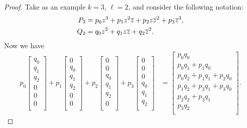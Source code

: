 \begin{proposition}
\begin{proof}
Take as an example $k=3$, $\ell=2$, and consider the following notation:
\begin{align*}
P_3&=p_0z^3+p_1z^2\overline{z}+p_2z\overline{z}^2+p_3\overline{z}^3,\\
Q_2&=q_0z^2+q_1z\overline{z}+q_2\overline{z}^2.
\end{align*}
Now we have
\begin{align*}
p_0
\begin{bmatrix}
q_0\\
q_1\\
q_2\\
0\\
0\\
0\\
\end{bmatrix}
+p_1
\begin{bmatrix}
0\\
q_0\\
q_1\\
q_2\\
0\\
0\\
\end{bmatrix}
+p_2
\begin{bmatrix}
0\\
0\\
q_0\\
q_1\\
q_2\\
0\\
\end{bmatrix}
+p_3
\begin{bmatrix}
0\\
0\\
0\\
q_0\\
q_1\\
q_2\\
\end{bmatrix}
&=
\begin{bmatrix}
p_0q_0\\
p_0q_1+p_1q_0\\
p_0q_2+p_1q_1+p_2q_0\\
p_1q_2+p_2q_1+p_3q_0\\
p_2q_2+p_3q_1\\
p_3q_2\\
\end{bmatrix}.
\end{align*}


\end{proof}
\end{proposition}
